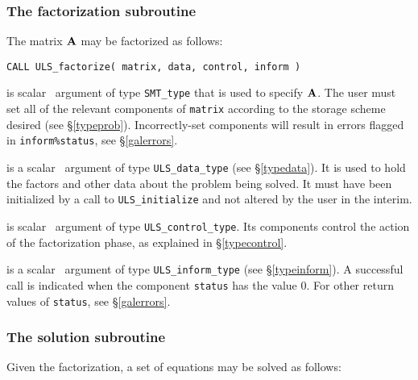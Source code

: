 \documentclass{galahad}
\newcommand{\packagename}{ULS}
\begin{document}

\subsubsection{The factorization subroutine}
The matrix ${\mathbf{A}}$ may be factorized as follows:

\hskip0.5in
{\tt CALL \packagename\_factorize( matrix, data, control, inform )}

\begin{description}

 is scalar \intentin\ argument of type {\tt SMT\_type}
that is used to specify ${\mathbf{A}}$.
The user must set all of the relevant components of {\tt matrix} according
to the storage scheme desired (see \S\ref{typeprob}).
Incorrectly-set components will result in errors
flagged in {\tt inform\%status}, see \S\ref{galerrors}.


 is a scalar \intentinout\ argument of type
{\tt \packagename\_data\_type}
(see \S\ref{typedata}). It is used to hold the factors and other
data about the problem being solved.
It must have been initialized by a call to
{\tt \packagename\_ini\-tialize} and not altered by the user in the interim.

 is scalar \intentin\ argument of type
{\tt \packagename\_control\_type}. Its components control the action
of the factorization phase, as explained in
\S\ref{typecontrol}.

 is a scalar \intentinout\ argument of type
{\tt \packagename\_inform\_type}
(see \S\ref{typeinform}).
A successful call is indicated when the  component {\tt status} has the value 0.
For other return values of {\tt status}, see \S\ref{galerrors}.

\end{description}


\subsubsection{The solution subroutine}
Given the factorization, a set of equations may be solved as follows:
\end{document}
